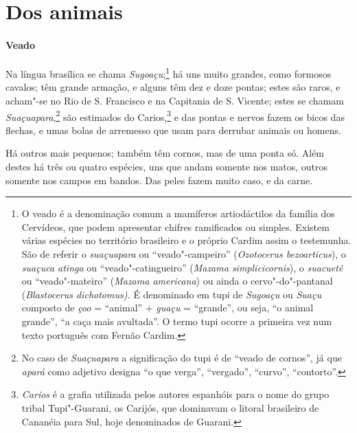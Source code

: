 \section{Dos animais}
\paragraph{Veado} Na língua brasílica se chama \textit{Sugoaçu};\footnote{ O veado 
é a denominação comum a mamíferos artiodáctilos
da família dos Cervídeos, que podem apresentar chifres ramificados ou
simples. Existem várias espécies no território brasileiro e o próprio
Cardim assim o testemunha. São de referir o \textit{suaçuapara} ou
``veado"-campeiro'' (\textit{Ozotocerus bezoarticus}), o \textit{suaçuca
atinga} ou ``veado"-catingueiro'' (\textit{Mazama simplicicornis}), o
\textit{suacuetê} ou ``veado"-mateiro'' (\textit{Mazama americana}) ou
ainda o cervo"-do"-pantanal (\textit{Blastocerus dichotomus).} É
denominado em tupi de \textit{Sugoaçu} ou \textit{Suaçu} composto de
\textit{çoo} = ``animal'' + \textit{guaçu} = ``grande'', ou seja, ``o animal
grande'', ``a caça mais avultada''. O termo tupi ocorre a primeira vez num
texto português com Fernão Cardim.} há uns muito grandes,
como formosos cavalos; têm grande armação, e alguns têm dez e doze
pontas; estes são raros, e acham"-se no Rio de S. Francisco e na
Capitania de S. Vicente; estes se chamam \textit{Suaçuapara},\footnote{ No caso de 
\textit{Suaçuapara} a significação do tupi é
de ``veado de cornos'', já que \textit{apará} como adjetivo designa ``o
que verga'', ``vergado'', ``curvo'', ``contorto''.} são
estimados do Carios,\footnote{ \textit{Carios} é a grafia
utilizada pelos autores espanhóis para o nome do grupo tribal
Tupi"-Guarani, os Carijós, que dominavam o litoral brasileiro de
Cananéia para Sul, hoje denominados de Guarani.} e das pontas e nervos
fazem os bicos das flechas, e umas bolas de arremesso que usam para
derrubar animais ou homens.

Há outros mais pequenos; também têm cornos, mas de uma ponta só. Além
destes há três ou quatro espécies, uns que andam somente nos matos,
outros somente nos campos em bandos. Das peles fazem muito caso, e da carne. 

